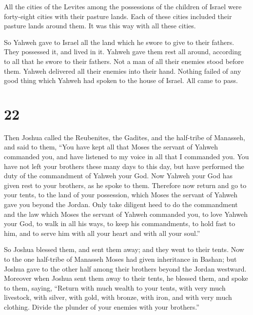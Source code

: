  All the cities of the Levites among the possessions of
the children of Israel were forty-eight cities with their pasture lands.
 Each of these cities included their pasture lands around
them. It was this way with all these cities.

 So Yahweh gave to Israel all the land which he swore to
give to their fathers. They possessed it, and lived in it.
 Yahweh gave them rest all around, according to all that
he swore to their fathers. Not a man of all their enemies stood before
them. Yahweh delivered all their enemies into their hand.
 Nothing failed of any good thing which Yahweh had spoken
to the house of Israel. All came to pass.

\hypertarget{section-21}{%
\section{22}\label{section-21}}

 Then Joshua called the Reubenites, the Gadites, and the
half-tribe of Manasseh,  and said to them, ``You have kept
all that Moses the servant of Yahweh commanded you, and have listened to
my voice in all that I commanded you.  You have not left
your brothers these many days to this day, but have performed the duty
of the commandment of Yahweh your God.  Now Yahweh your
God has given rest to your brothers, as he spoke to them. Therefore now
return and go to your tents, to the land of your possession, which Moses
the servant of Yahweh gave you beyond the Jordan.  Only
take diligent heed to do the commandment and the law which Moses the
servant of Yahweh commanded you, to love Yahweh your God, to walk in all
his ways, to keep his commandments, to hold fast to him, and to serve
him with all your heart and with all your soul.''

 So Joshua blessed them, and sent them away; and they went
to their tents.  Now to the one half-tribe of Manasseh
Moses had given inheritance in Bashan; but Joshua gave to the other half
among their brothers beyond the Jordan westward. Moreover when Joshua
sent them away to their tents, he blessed them,  and spoke
to them, saying, ``Return with much wealth to your tents, with very much
livestock, with silver, with gold, with bronze, with iron, and with very
much clothing. Divide the plunder of your enemies with your brothers.''

